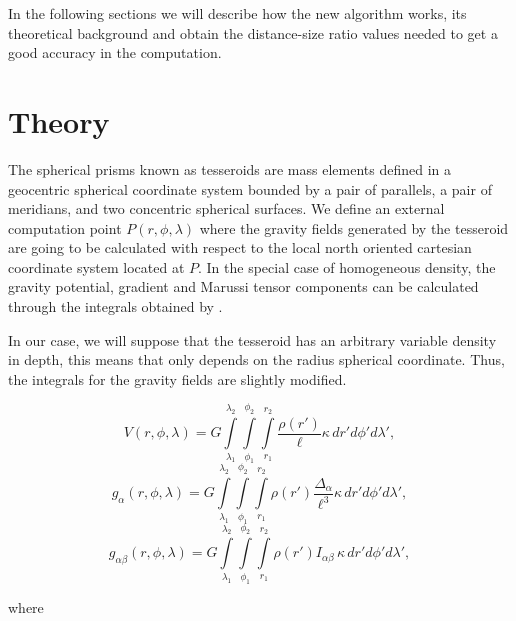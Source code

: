 \documentclass[extra]{gji}
\begin{document}
In the following sections we will describe how the new algorithm works, its theoretical background and obtain the distance-size ratio values needed to get a good accuracy in the computation.


\section{Theory}

The spherical prisms known as tesseroids are mass elements defined in a geocentric spherical coordinate system bounded by a pair of parallels, a pair of  meridians, and two concentric spherical surfaces.
We define an external computation point $P(r, \phi, \lambda)$ where the gravity fields generated by the tesseroid are going to be calculated with respect to the local north oriented cartesian coordinate system located at $P$.
In the special case of homogeneous density, the gravity potential, gradient and Marussi tensor components can be calculated through the integrals obtained by \citet{Grombein2013} \citep[see also][]{Uieda2016}.

In our case, we will suppose that the tesseroid has an arbitrary variable density in depth, this means that only depends on the radius spherical coordinate. Thus, the integrals for the gravity fields are slightly modified.

\begin{equation}
    V(r,\phi,\lambda) = G
    \int\limits_{\lambda_1}^{\lambda_2}
    \int\limits_{\phi_1}^{\phi_2}
    \int\limits_{r_1}^{r_2}
    \frac{\rho(r')}{\ell} \kappa \,  dr' d\phi' d\lambda',
\label{eq:tesseroid-pot}
\end{equation}
\begin{equation}
    g_{\alpha}(r,\phi,\lambda) = G
    \int\limits_{\lambda_1}^{\lambda_2}
    \int\limits_{\phi_1}^{\phi_2}
    \int\limits_{r_1}^{r_2}
    \rho(r') \frac{\Delta_\alpha}{\ell^3}
    \kappa \, dr' d\phi' d\lambda',
\label{eq:tesseroid-grav}
\end{equation}
\begin{equation}
    g_{\alpha\beta}(r,\phi,\lambda) = G
    \int\limits_{\lambda_1}^{\lambda_2}
    \int\limits_{\phi_1}^{\phi_2}
    \int\limits_{r_1}^{r_2}
    \rho(r') I_{\alpha\beta} \, \kappa \, dr' d\phi' d\lambda' ,
    \label{eq:tesseroid-tensor}
\end{equation}

\noindent where
\end{document}
